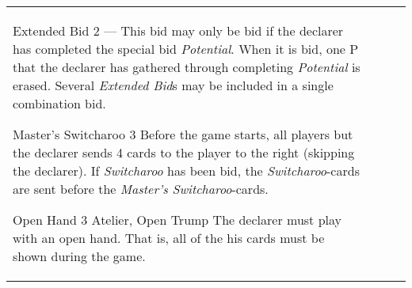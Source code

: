\begin{table}
\begin{center}
\begin{tabularx}{\textwidth}{lcp{3cm}|X}
			\specialBidItem%
			{Extended Bid}
			{$2$}
			{---}
			{%
				This bid may only be bid if the declarer has completed the special bid \emph{Potential}. When it is bid, one P that the declarer has gathered through completing \emph{Potential} is erased. Several \emph{Extended Bid}s may be included in a single combination bid.
			}

			\specialBidItem%
			{Master's Switcharoo}
			{$3$}
			{\nonTrump}
			{%
				Before the game starts, all players but the declarer sends 4 cards to the player to the right (skipping the declarer). If \emph{Switcharoo} has been bid, the \emph{Switcharoo}-cards are sent before the \emph{Master's Switcharoo}-cards.
			}

			\specialBidItem%
			{Open Hand}
			{$3$}
			{Atelier, Open Trump}
			{%
				The declarer must play with an open hand. That is, all of the his cards must be shown during the game.
			}
		\end{tabularx}
	\end{center}
\end{table}
